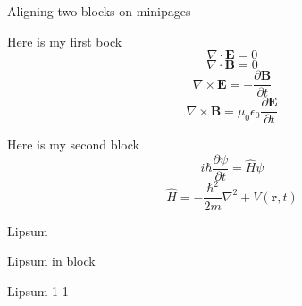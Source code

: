 \documentclass[9pt, aspectratio=169]{beamer}
\begin{document}
\begin{frame}{Aligning two blocks on minipages}
\begin{minipage}[t]{0.46\textwidth}
    \begin{block}{Here is my first bock}
        \begin{equation}
            \nabla \cdot \mathbf{E} = 0
        \end{equation}
        \begin{equation}
            \nabla \cdot \mathbf{B} = 0
        \end{equation}
        \begin{equation}
            \nabla \times \mathbf{E} = -\frac{\partial \mathbf{B}}{\partial t}
        \end{equation}
        \begin{equation}
            \nabla \times \mathbf{B} = \mu_0 \epsilon_0 \frac{\partial \mathbf{E}}{\partial t}
        \end{equation}
    \end{block}
\end{minipage}
\hspace{.8cm}
\begin{minipage}[t]{0.46\textwidth}
    \begin{block}{Here is my second block}
        \begin{equation}
            i \hbar \frac{\partial \psi}{\partial t} = \hat{H} \psi
        \end{equation}
        \begin{equation}
            \hat{H} = -\frac{\hbar^2}{2m} \nabla^2 + V(\mathbf{r}, t)
        \end{equation}
    \end{block}
\end{minipage}
\end{frame}
\begin{frame}{Lipsum}
    \lipsum[1-1]
\end{frame}
\begin{frame}{Lipsum in block}
    \begin{block}{Lipsum 1-1}
        \lipsum[1-1]
    \end{block}
\end{frame}
\end{document}
